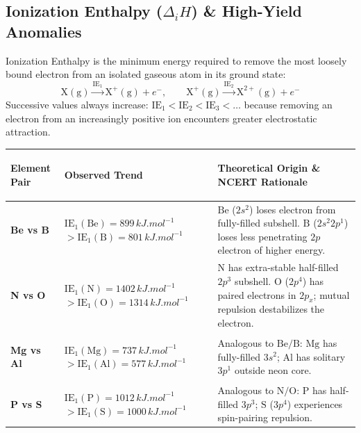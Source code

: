 \documentclass[10pt,twoside,openright]{book}
\begin{document}
\subsection{Ionization Enthalpy ($\Delta_i H$) \& High-Yield Anomalies}
Ionization Enthalpy is the minimum energy required to remove the most loosely bound electron from an isolated gaseous atom in its ground state:
\begin{equation}
  \mathrm{X(g)} \xrightarrow{\text{IE}_1} \mathrm{X^+(g)} + e^-, \qquad \mathrm{X^+(g)} \xrightarrow{\text{IE}_2} \mathrm{X^{2+}(g)} + e^-
\end{equation}
Successive values always increase: $\text{IE}_1 < \text{IE}_2 < \text{IE}_3 < \dots$ because removing an electron from an increasingly positive ion encounters greater electrostatic attraction.

\begin{table}[htbp]
\centering
\footnotesize
\setlength{\tabcolsep}{3pt}
\renewcommand{\arraystretch}{1.2}
\begin{tabularx}{\textwidth}{>{\bfseries\raggedright\arraybackslash}p{2.0cm} p{2.8cm} X}
\toprule
\textbf{Element Pair} & \textbf{Observed Trend} & \textbf{Theoretical Origin \& NCERT Rationale} \\
\midrule
\textbf{Be vs B} & $\text{IE}_1(\mathrm{Be}) = 899\,\si{kJ.mol^{-1}}$ \newline $> \text{IE}_1(\mathrm{B}) = 801\,\si{kJ.mol^{-1}}$ & $\mathrm{Be}$ ($2s^2$) loses electron from fully-filled subshell. $\mathrm{B}$ ($2s^2 2p^1$) loses less penetrating $2p$ electron of higher energy. \\
\midrule
\textbf{N vs O} & $\text{IE}_1(\mathrm{N}) = 1402\,\si{kJ.mol^{-1}}$ \newline $> \text{IE}_1(\mathrm{O}) = 1314\,\si{kJ.mol^{-1}}$ & $\mathrm{N}$ has extra-stable half-filled $2p^3$ subshell. $\mathrm{O}$ ($2p^4$) has paired electrons in $2p_x$; mutual repulsion destabilizes the electron. \\
\midrule
\textbf{Mg vs Al} & $\text{IE}_1(\mathrm{Mg}) = 737\,\si{kJ.mol^{-1}}$ \newline $> \text{IE}_1(\mathrm{Al}) = 577\,\si{kJ.mol^{-1}}$ & Analogous to $\mathrm{Be/B}$: $\mathrm{Mg}$ has fully-filled $3s^2$; $\mathrm{Al}$ has solitary $3p^1$ outside neon core. \\
\midrule
\textbf{P vs S} & $\text{IE}_1(\mathrm{P}) = 1012\,\si{kJ.mol^{-1}}$ \newline $> \text{IE}_1(\mathrm{S}) = 1000\,\si{kJ.mol^{-1}}$ & Analogous to $\mathrm{N/O}$: $\mathrm{P}$ has half-filled $3p^3$; $\mathrm{S}$ ($3p^4$) experiences spin-pairing repulsion. \\

\end{tabularx}
\end{table}
\end{document}
